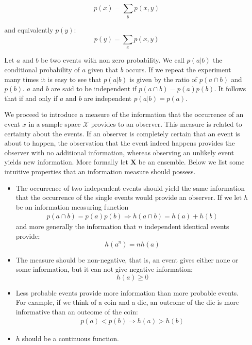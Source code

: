 \begin{equation}
p(x)=\sum_{y}p(x,y)
\end{equation} 

\noindent and equivalently $p(y)$:
\begin{equation}
p(y)=\sum_{x}p(x,y)
\end{equation} 

Let $a$ and $b$ be two events with non zero probability. We call $p(a|b)$ the conditional probability of $a$ given that $b$ occurs. If we repeat the experiment many times it is easy to see that $p(a|b)$ is given by the ratio of $p(a\cap b)$ and $p(b)$. $a$ and $b$ are said to be independent if $p(a\cap b)=p(a)p(b)$. It follows that if and only if $a$ and $b$ are independent $p(a|b)=p(a)$.

We proceed to introduce a measure of the information that the occurrence of an event $x$ in a sample space $\mathcal{X}$ provides to an observer. This measure is related to certainty about the events. If an observer is completely certain that an event is about to happen, the observation that the event indeed happens provides the observer with no additional information, whereas observing an unlikely event yields new information. More formally let $\mathbf{X}$ be an ensemble. Below we list some intuitive properties that an information measure should possess. 

\begin{itemize}
\item The occurrence of two independent events should yield the same information that the occurrence of the single events would provide an observer. If we let $h$ be an information measuring function
         \begin{eqnarray}
         p(a\cap b)=p(a) p(b)\Rightarrow h(a\cap b) = h(a)+h(b)
         \end{eqnarray}
         and more generally the information that $n$ independent identical events provide:
         \begin{equation}
         \label{eq:indepentr}
         h(a^n) = nh(a)         
         \end{equation}
\item The measure should be non-negative, that is, an event gives either none or some information, but it can not give negative information:
         \begin{equation}
         h(a)\geq 0         
         \end{equation}
\item Less probable events provide more information than more probable events. For example, if we think of a coin and a die, an outcome of the die is more informative than an outcome of the coin:
         \begin{eqnarray}
         \label{eq:incentr}
         p(a)< p(b) \Rightarrow h(a)> h(b)
         \end{eqnarray}
\item $h$ should be a continuous function.     
\end{itemize}

